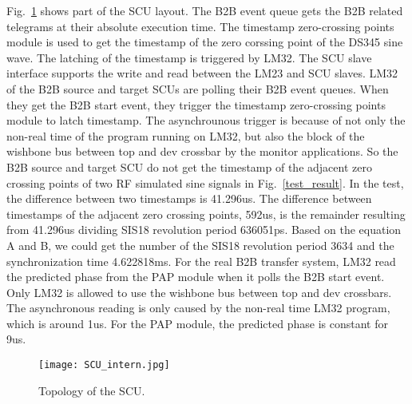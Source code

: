 Fig.~\ref{SCU_intern} shows part of the SCU layout. The B2B event queue gets the B2B related telegrams at their absolute execution time. The timestamp zero-crossing points module is used to get the timestamp of the zero corssing point of the DS345 sine wave. The latching of the timestamp is triggered by LM32. The SCU slave interface supports the write and read between the LM23 and SCU slaves. LM32 of the B2B source and target SCUs are polling their B2B event queues. When they get the B2B start event, they trigger the timestamp zero-crossing points module to latch timestamp. The asynchrounous trigger is because of not only the non-real time of the program running on LM32, but also the block of the wishbone bus between top and dev crossbar by the monitor applications. So the B2B source and target SCU do not get the timestamp of the adjacent zero crossing points of two RF simulated sine signals in Fig.~\ref{test_result}. In the test, the difference between two timestamps is 41.296us. The difference between timestamps of the adjacent zero crossing points, 592us, is the remainder resulting from 41.296us dividing SIS18 revolution period 636051ps. Based on the equation A and B, we could get the number of the SIS18 revolution period 3634 and the synchronization time 4.622818ms.
For the real B2B transfer system, LM32 read the predicted phase from the PAP module when it polls the B2B start event. Only LM32 is allowed to use the wishbone bus between top and dev crossbars. The asynchronous reading is only caused by the non-real time LM32 program, which is around 1us. For the PAP module, the predicted phase is constant for 9us.          
\begin{figure}[!htb]
   \centering   
   \texttt{[image: SCU\_intern.jpg]}
   \caption{Topology of the SCU.}
   \label{SCU_intern}
\end{figure}


